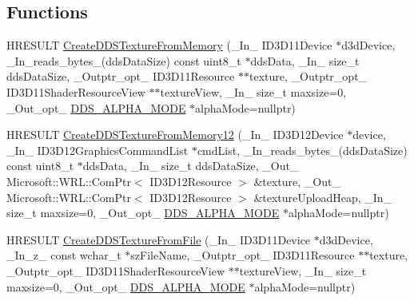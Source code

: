\subsection*{Functions}
\begin{DoxyCompactItemize}
\item 
H\+R\+E\+S\+U\+LT \hyperlink{namespace_direct_x_a62a12ff7a57a36483e157b1fb1fe8dff_a62a12ff7a57a36483e157b1fb1fe8dff}{Create\+D\+D\+S\+Texture\+From\+Memory} (\+\_\+\+In\+\_\+ I\+D3\+D11\+Device $\ast$d3d\+Device, \+\_\+\+In\+\_\+reads\+\_\+bytes\+\_\+(dds\+Data\+Size) const uint8\+\_\+t $\ast$dds\+Data, \+\_\+\+In\+\_\+ size\+\_\+t dds\+Data\+Size, \+\_\+\+Outptr\+\_\+opt\+\_\+ I\+D3\+D11\+Resource $\ast$$\ast$texture, \+\_\+\+Outptr\+\_\+opt\+\_\+ I\+D3\+D11\+Shader\+Resource\+View $\ast$$\ast$texture\+View, \+\_\+\+In\+\_\+ size\+\_\+t maxsize=0, \+\_\+\+Out\+\_\+opt\+\_\+ \hyperlink{namespace_direct_x_a7cb48689d75471680c0bf7f79caaaf1f_a7cb48689d75471680c0bf7f79caaaf1f}{D\+D\+S\+\_\+\+A\+L\+P\+H\+A\+\_\+\+M\+O\+DE} $\ast$alpha\+Mode=nullptr)
\item 
H\+R\+E\+S\+U\+LT \hyperlink{namespace_direct_x_a4fc6a2671e5a4fd5e6abb20ab0f8d3eb_a4fc6a2671e5a4fd5e6abb20ab0f8d3eb}{Create\+D\+D\+S\+Texture\+From\+Memory12} (\+\_\+\+In\+\_\+ I\+D3\+D12\+Device $\ast$device, \+\_\+\+In\+\_\+ I\+D3\+D12\+Graphics\+Command\+List $\ast$cmd\+List, \+\_\+\+In\+\_\+reads\+\_\+bytes\+\_\+(dds\+Data\+Size) const uint8\+\_\+t $\ast$dds\+Data, \+\_\+\+In\+\_\+ size\+\_\+t dds\+Data\+Size, \+\_\+\+Out\+\_\+ Microsoft\+::\+W\+R\+L\+::\+Com\+Ptr$<$ I\+D3\+D12\+Resource $>$ \&texture, \+\_\+\+Out\+\_\+ Microsoft\+::\+W\+R\+L\+::\+Com\+Ptr$<$ I\+D3\+D12\+Resource $>$ \&texture\+Upload\+Heap, \+\_\+\+In\+\_\+ size\+\_\+t maxsize=0, \+\_\+\+Out\+\_\+opt\+\_\+ \hyperlink{namespace_direct_x_a7cb48689d75471680c0bf7f79caaaf1f_a7cb48689d75471680c0bf7f79caaaf1f}{D\+D\+S\+\_\+\+A\+L\+P\+H\+A\+\_\+\+M\+O\+DE} $\ast$alpha\+Mode=nullptr)
\item 
H\+R\+E\+S\+U\+LT \hyperlink{namespace_direct_x_a72103949d0a30b4d1cf2c68fb4d0ec19_a72103949d0a30b4d1cf2c68fb4d0ec19}{Create\+D\+D\+S\+Texture\+From\+File} (\+\_\+\+In\+\_\+ I\+D3\+D11\+Device $\ast$d3d\+Device, \+\_\+\+In\+\_\+z\+\_\+ const wchar\+\_\+t $\ast$sz\+File\+Name, \+\_\+\+Outptr\+\_\+opt\+\_\+ I\+D3\+D11\+Resource $\ast$$\ast$texture, \+\_\+\+Outptr\+\_\+opt\+\_\+ I\+D3\+D11\+Shader\+Resource\+View $\ast$$\ast$texture\+View, \+\_\+\+In\+\_\+ size\+\_\+t maxsize=0, \+\_\+\+Out\+\_\+opt\+\_\+ \hyperlink{namespace_direct_x_a7cb48689d75471680c0bf7f79caaaf1f_a7cb48689d75471680c0bf7f79caaaf1f}{D\+D\+S\+\_\+\+A\+L\+P\+H\+A\+\_\+\+M\+O\+DE} $\ast$alpha\+Mode=nullptr)

\end{DoxyCompactItemize}
